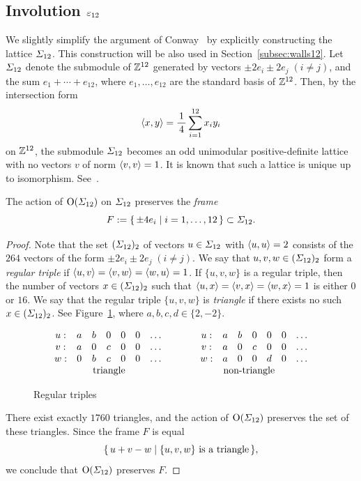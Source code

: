 \documentclass{amsart} %
\begin{document}
\subsection{Involution $\varepsilon_{12}$}\label{subsec:vep12}
%
We slightly simplify the argument of Conway~\cite[Chapter~10, Section~3.7]{theCSbook} 
by explicitly constructing the lattice $\varSigma_{12}$.
This construction will be also used in Section~\ref{subsec:walls12}.
Let $\varSigma_{12}$ denote the submodule of $\mathord{\mathbb{Z}}^{12}$ generated by vectors 
$\pm 2 e_i\pm 2 e_j\; (i\ne j)$, 
and the sum $e_1+\cdots+e_{12}$,
where $e_1,\dots, e_{12}$ are the standard basis of $\mathord{\mathbb{Z}}^{12}$.
Then, by the intersection form 
\[
\langle x, y \rangle=\frac{1}{\,4\,} \sum_{i=1}^{12} x_i y_i
\]
on $\mathord{\mathbb{Z}}^{12}$, the submodule $\varSigma_{12}$ becomes an odd unimodular
positive-definite lattice with no vectors $v$ of norm  $\langle v, v \rangle=1$.
It is known that such a lattice is unique up to isomorphism. 
See~\cite[Table 16.7]{theCSbook}.
%
\begin{lemma}\label{lem:frame}
The action of $\mathord{\mathrm{O}}(\varSigma_{12})$ on $\varSigma_{12}$ preserves
the \emph{frame}
\[
F:=\{\,{\pm 4 e_i}\mid {i=1, \dots, 12} \,\}\subset \varSigma_{12}.
\]
\end{lemma}
%
\begin{proof}
Note that the set $(\varSigma_{12})_2$ of vectors $u\in \varSigma_{12}$ with $\langle u, u \rangle=2$
consists of the $264$ vectors of the form $\pm 2 e_i\pm 2 e_j\; (i\ne j)$.
We say that $u, v, w\in( \varSigma_{12})_2$ form a \emph{regular triple} if 
$\langle u, v \rangle=\langle v, w \rangle=\langle w, u \rangle=1$.
If $\{u, v, w\}$ is a regular triple, then the number of 
vectors $x\in( \varSigma_{12})_2$ such that 
$\langle u, x \rangle=\langle v, x \rangle=\langle w, x \rangle=1$
is either $0$ or $16$.
We say that the regular triple $\{u, v, w\}$ is \emph{triangle} if there exists no such $x\in (\varSigma_{12})_2$.
See Figure~\ref{fig:triangle},
where $a, b, c , d\in \{2, -2\}$.
%
\begin{figure}
{\small
\[
\begin{array}{ccccccc}
u: & a& b & 0 & 0 & 0 &\dots\\
v: &a&0 & c & 0 & 0 &\dots\\
w: & 0& b & c & 0 & 0 & \dots\\
& \rlap{\textrm{\;\;\;\;\;triangle}} && &
\end{array}
\qquad\quad
\begin{array}{ccccccc}
u: &a& b & 0 & 0 & 0 &\dots\\
v: &a&0 & c & 0 & 0 & \dots\\
w: &a& 0 & 0 & d & 0 & \dots\\
\rlap{ \textrm{\;\;\;\;\;non-triangle}} && & &
\end{array}
\]
}
\vskip -1mm
\caption{Regular triples}\label{fig:triangle}
\end{figure}
%
There exist exactly $1760$ triangles, and 
the action of $\mathord{\mathrm{O}}(\varSigma_{12})$ preserves the set of these triangles.
Since 
 the frame $F$ is equal 
\[
\{\,{u+v-w}\mid {\textrm{$\{u, v, w\}$ is a triangle}} \,\},
\]
we conclude that $\mathord{\mathrm{O}}(\varSigma_{12})$ preserves $F$.
\end{proof}
\end{document}
